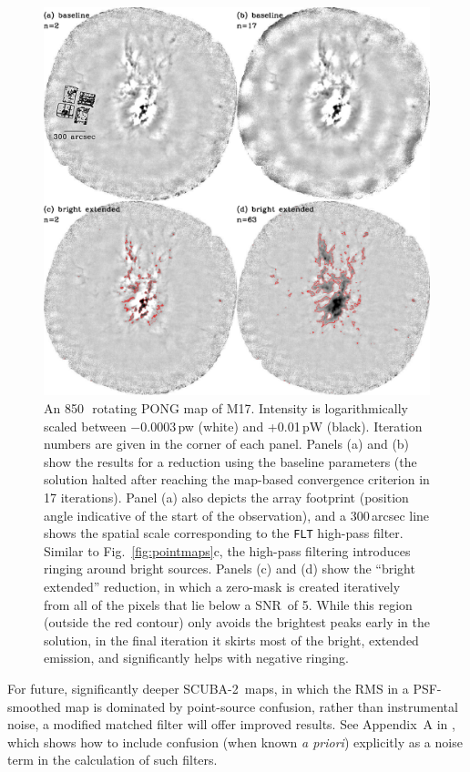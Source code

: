 \documentclass[useAMS,usenatbib,nofootinbib]{mn2e}
\newcommand{\snr}{SNR}
\newcommand{\scuba}{SCUBA-2}
\newcommand{\model}[1]{\texttt{#1}}
\begin{document}
\begin{figure}
\centering
\includegraphics[width=\linewidth]{m17}
\caption{An 850\,\micron\ rotating PONG map of M17. Intensity is
logarithmically scaled between $-$0.0003\,pw (white) and +0.01\,pW
(black). Iteration numbers are given in the corner of each
panel. Panels (a) and (b) show the results for a reduction using the
baseline parameters (the solution halted after reaching the map-based
convergence criterion in 17 iterations). Panel (a) also depicts the
array footprint (position angle indicative of the start of the
observation), and a 300\,arcsec line shows the spatial scale
corresponding to the \model{FLT} high-pass filter. Similar to
Fig.~\ref{fig:pointmaps}c, the high-pass filtering introduces ringing
around bright sources. Panels (c) and (d) show the ``bright extended''
reduction, in which a zero-mask is created iteratively from all of the
pixels that lie below a \snr\ of 5. While this region (outside the red
contour) only avoids the brightest peaks early in the solution, in the
final iteration it skirts most of the bright, extended emission, and
significantly helps with negative ringing.}
\label{fig:m17}
\end{figure}

For future, significantly deeper \scuba\ maps, in which the RMS in a
PSF-smoothed map is dominated by point-source confusion, rather than
instrumental noise, a modified matched filter will offer improved
results. See Appendix~A in \citet{chapin2011}, which shows how to
include confusion (when known \emph{a priori}) explicitly as a noise
term in the calculation of such filters.
\end{document}
